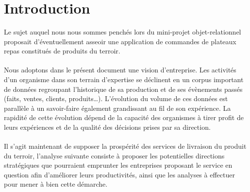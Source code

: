 \section{Introduction}

\paragraph{} Le sujet auquel nous nous sommes penchés lors du mini-projet objet-relationnel proposait d’éventuellement asseoir une application de commandes de plateaux repas constitués de produits du terroir. 

\paragraph{} Nous adoptons dans le présent document une vision d’entreprise. Les activités d’un organisme dans son terrain d’expertise se déclinent en un corpus important de données regroupant l’historique de sa production et de ses évènements passés (faits, ventes, clients, produits…).
L’évolution du volume de ces données est parallèle à un savoir-faire également grandissant au fil de son expérience. La rapidité de cette évolution dépend de la capacité des organismes à tirer profit de leurs expériences et de la qualité des décisions prises par sa direction.

\paragraph{} Il s’agit maintenant de supposer la prospérité des services de livraison du produit du terroir, l’analyse suivante consiste à proposer les potentielles directions stratégiques que pourraient emprunter les entreprises proposant le service en question afin d’améliorer leurs productivités, ainsi que les analyses à effectuer pour mener à bien cette démarche.